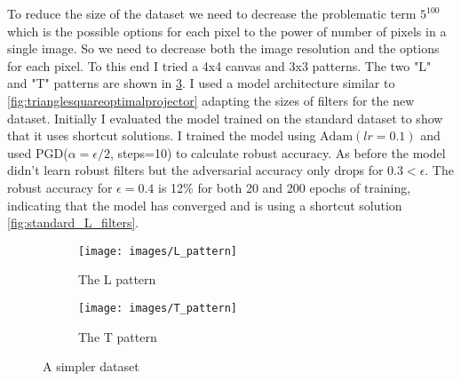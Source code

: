 \documentclass[../thesis.tex]{subfiles}
\begin{document}
	To reduce the size of the dataset we need to decrease the problematic term $5^{100}$ which is the possible options for each pixel to the power of number of pixels in a single image. So we need to decrease both the image resolution and the options for each pixel. 
	To this end I tried a 4x4 canvas and 3x3 patterns. The two "L" and "T" patterns are shown in \ref{fig:L-T-patterns}. I used a model architecture similar to \ref{fig:trianglesquareoptimalprojector} adapting the sizes of filters for the new dataset. Initially I evaluated the model trained on the standard dataset to show that it uses shortcut solutions. I trained the model using $\text{Adam}(lr=0.1)$ and used PGD($\alpha = \epsilon/2$, steps=10) to calculate robust accuracy. As before the model didn't learn robust filters but the adversarial accuracy only drops for $0.3 <\epsilon$. The robust accuracy for $\epsilon = 0.4$ is 12\% for both 20 and 200 epochs of training, indicating that the model has converged and is using a shortcut solution \ref{fig:standard_L_filters}. 

	\begin{figure}
		\centering
		\begin{subfigure}{.5\textwidth}
			\centering
			\texttt{[image: images/L\_pattern]}
			\caption{The L pattern}
			\label{fig:L_pattern}
		\end{subfigure}%
		\begin{subfigure}{.5\textwidth}
			\centering
			\texttt{[image: images/T\_pattern]}
			\caption{The T pattern}
			\label{fig:T_pattern}
		\end{subfigure}
		\caption{A simpler dataset}
		\label{fig:L-T-patterns}
	\end{figure}

	
	
	
\end{document}
